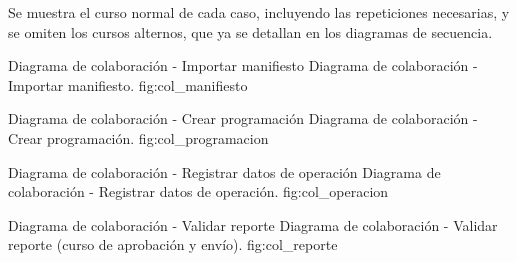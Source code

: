 Se muestra el curso normal de cada caso, incluyendo las repeticiones necesarias, y se omiten los
cursos alternos, que ya se detallan en los diagramas de secuencia.

{Diagrama de colaboración - Importar manifiesto}
{Diagrama de colaboración - Importar manifiesto.}
{fig:col_manifiesto}

{Diagrama de colaboración - Crear programación}
{Diagrama de colaboración - Crear programación.}
{fig:col_programacion}

{Diagrama de colaboración - Registrar datos de operación}
{Diagrama de colaboración - Registrar datos de operación.}
{fig:col_operacion}

{Diagrama de colaboración - Validar reporte}
{Diagrama de colaboración - Validar reporte (curso de aprobación y envío).}
{fig:col_reporte}

\fussy
